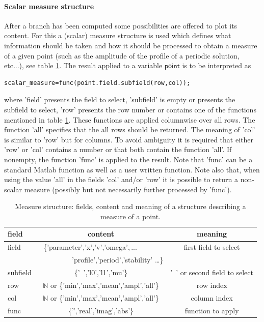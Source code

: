 \documentclass[10pt]{article}
\gdef \parm#1{{\mathsf{#1}}}
\gdef \NN{{\mathbb N}}
\begin{document}
{\paragraph{Scalar measure structure}

After a branch has been computed some possibilities are offered
to plot its content. For this a (scalar) measure structure is
used which defines what information should be taken 
and how it should
be processed 
to obtain a measure of a given point (such as the 
amplitude of the profile of a periodic solution, etc...), 
see table \ref{measure_structure}.
The result applied to a variable $\parm{point}$ is to be interpreted as
\begin{verbatim}
scalar_measure=func(point.field.subfield(row,col));
\end{verbatim}
where 'field' presents the field to select, 'subfield'
is empty or presents the subfield to select, 'row'
presents the row number or contains one of the functions mentioned
in table \ref{measure_structure}.
These functions are applied columnwise over all rows.
The function 'all' specifies that the all rows should
be returned. 
The meaning of 'col' is similar to 'row' but for columns.
To avoid ambiguity it is required that either 'row' or 'col' 
contains a number or that both contain the function 'all'.
If nonempty, the function 'func' is applied to the result.
Note that 'func' can be a standard Matlab function as well as 
a user written function. Note also that, when using the 
value 'all' in the fields 'col' and/or 'row' it is possible to return
a non-scalar measure (possibly but not necessarily 
further processed by 'func').

\begin{table}
\begin{center}
\begin{tabular}{l|c|c}
field  & content & meaning      \\\hline 
field & \{'parameter','x','v','omega',\,...\ \ \ \ \ \  & first field to select \\     
       & \ \ \ \ \ \ \ \ \ \,'profile','period','stability' \ldots\} & \\
subfield & \{'\ ','l0','l1','mu'\} & '\ ' or second field to select \\
row     & $\NN$ or \{'min','max','mean','ampl','all'\} & row index \\
col     & $\NN$ or \{'min','max','mean','ampl','all'\} & column index \\
func   & \{'','real','imag','abs'\} & function to apply
\end{tabular}
\end{center}
\caption{\small\label{measure_structure}
Measure structure: fields, content and meaning of
a structure describing
a measure of a point.}
\end{table}

}
\end{document}
